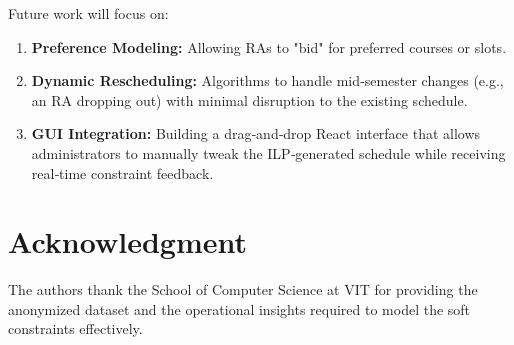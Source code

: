 \documentclass[journal,onecolumn]{IEEEtran}
\begin{document}
Future work will focus on:
\begin{enumerate}
    \item \textbf{Preference Modeling:} Allowing RAs to "bid" for preferred courses or slots.
    \item \textbf{Dynamic Rescheduling:} Algorithms to handle mid‑semester changes (e.g., an RA dropping out) with minimal disruption to the existing schedule.
    \item \textbf{GUI Integration:} Building a drag‑and‑drop React interface that allows administrators to manually tweak the ILP‑generated schedule while receiving real‑time constraint feedback.
\end{enumerate}

\section*{Acknowledgment}

The authors thank the School of Computer Science at VIT for providing the anonymized dataset and the operational insights required to model the soft constraints effectively.
\end{document}
